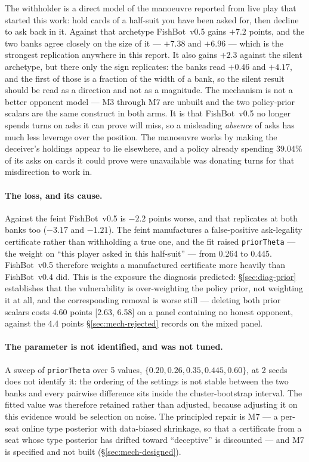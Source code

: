 \documentclass[11pt]{article}
\theoremstyle{definition}
\DeclareRobustCommand{\vfive}{\texorpdfstring{\mbox{FishBot v0.5}}{FishBot v0.5}}
\DeclareRobustCommand{\vfour}{\texorpdfstring{\mbox{FishBot v0.4}}{FishBot v0.4}}
\providecommand{\numAgnosticCost}{4.4}
\providecommand{\numFourDeadAsk}{39.04}
\providecommand{\numDecSeeds}{2}
\providecommand{\numDecSilentDelta}{+2.3}
\providecommand{\numDecFeintDelta}{-2.2}
\providecommand{\numDecWithholderDelta}{+7.2}
\providecommand{\numThetaSweep}{0.20, 0.26, 0.35, 0.445, 0.60}
\providecommand{\numThetaSweepN}{5}
\providecommand{\numPriorThetaFour}{0.264}
\providecommand{\numPriorThetaFive}{0.445}
\providecommand{\numPriorDeleteCI}{2.63, 6.58}
\providecommand{\numPriorDeleteCost}{4.60}
\providecommand{\numDecSilentDeltaA}{+0.46}
\providecommand{\numDecSilentDeltaB}{+4.17}
\providecommand{\numDecFeintDeltaA}{-3.17}
\providecommand{\numDecFeintDeltaB}{-1.21}
\providecommand{\numDecWithholderDeltaA}{+7.38}
\providecommand{\numDecWithholderDeltaB}{+6.96}
\begin{document}
The withholder is a direct model of the manoeuvre reported from live play that
started this work: hold cards of a half-suit you have been asked for, then
decline to ask back in it. Against that archetype \vfive{} gains
$\numDecWithholderDelta$ points, and the two banks agree closely on the size of
it --- $\numDecWithholderDeltaA$ and $\numDecWithholderDeltaB$ --- which is the
strongest replication anywhere in this report. It also gains
$\numDecSilentDelta$ against the silent archetype, but there only the sign
replicates: the banks read $\numDecSilentDeltaA$ and $\numDecSilentDeltaB$, and
the first of those is a fraction of the width of a bank, so the silent result
should be read as a direction and not as a magnitude. The mechanism is not a better
opponent model --- M3 through M7 are unbuilt and the two policy-prior scalars are
the same construct in both arms. It is that \vfive{} no longer spends turns on
asks it can prove will miss, so a misleading \emph{absence} of asks has much less
leverage over the position. The manoeuvre works by making the deceiver's holdings
appear to lie elsewhere, and a policy already spending \numFourDeadAsk\% of its
asks on cards it could prove were unavailable was donating turns for that
misdirection to work in.

\paragraph{The loss, and its cause.} Against the feint \vfive{} is
$\numDecFeintDelta$ points worse, and that replicates at both banks too
($\numDecFeintDeltaA$ and $\numDecFeintDeltaB$). The
feint manufactures a false-positive ask-legality certificate rather than
withholding a true one, and the fit raised \texttt{priorTheta} --- the weight on
``this player asked in this half-suit'' --- from \numPriorThetaFour{} to
\numPriorThetaFive{}. \vfive{} therefore weights a manufactured certificate more
heavily than \vfour{} did. This is the exposure the diagnosis predicted:
\S\ref{sec:diag-prior} establishes that the vulnerability is over-weighting the
policy prior, not weighting it at all, and the corresponding removal is worse
still --- deleting both prior scalars costs \numPriorDeleteCost{} points
[\numPriorDeleteCI] on a panel containing no honest opponent, against the
\numAgnosticCost{} points \S\ref{sec:mech-rejected} records on the mixed panel.

\paragraph{The parameter is not identified, and was not tuned.} A sweep of
\texttt{priorTheta} over \numThetaSweepN{} values, $\{\numThetaSweep\}$, at
\numDecSeeds{} seeds does not identify it: the ordering of the settings is not
stable between the two banks and every pairwise difference sits inside the
cluster-bootstrap interval. The fitted value was therefore retained rather than
adjusted, because adjusting it on this evidence would be selection on noise. The
principled repair is M7 --- a per-seat online type posterior with data-biased
shrinkage, so that a certificate from a seat whose type posterior has drifted
toward ``deceptive'' is discounted --- and M7 is specified and not built
(\S\ref{sec:mech-designed}).
\end{document}
